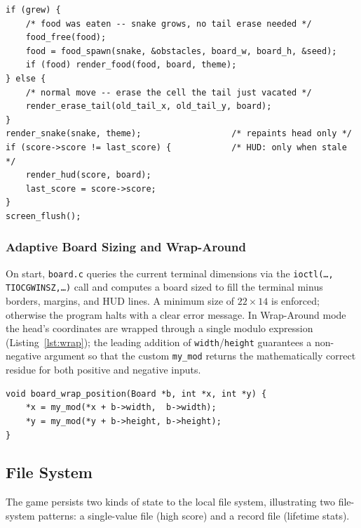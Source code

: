 \documentclass[conference]{IEEEtran}
\begin{document}
\begin{lstlisting}[caption={Delta-render hot path: O(1) per tick, regardless of snake length.},label={lst:delta}]
if (grew) {
    /* food was eaten -- snake grows, no tail erase needed */
    food_free(food);
    food = food_spawn(snake, &obstacles, board_w, board_h, &seed);
    if (food) render_food(food, board, theme);
} else {
    /* normal move -- erase the cell the tail just vacated */
    render_erase_tail(old_tail_x, old_tail_y, board);
}
render_snake(snake, theme);                  /* repaints head only */
if (score->score != last_score) {            /* HUD: only when stale */
    render_hud(score, board);
    last_score = score->score;
}
screen_flush();
\end{lstlisting}

\subsubsection{Adaptive Board Sizing and Wrap-Around}
On start, \texttt{board.c} queries the current terminal dimensions via the \texttt{ioctl(\dots,\,TIOCGWINSZ,\dots)} call and computes a board sized to fill the terminal minus borders, margins, and HUD lines. A minimum size of $22 \times 14$ is enforced; otherwise the program halts with a clear error message. In Wrap-Around mode the head's coordinates are wrapped through a single modulo expression (Listing~\ref{lst:wrap}); the leading addition of \texttt{width}/\texttt{height} guarantees a non-negative argument so that the custom \texttt{my\_mod} returns the mathematically correct residue for both positive and negative inputs.

\begin{lstlisting}[caption={Branch-free toroidal wrap using the custom \texttt{my\_mod}.},label={lst:wrap}]
void board_wrap_position(Board *b, int *x, int *y) {
    *x = my_mod(*x + b->width,  b->width);
    *y = my_mod(*y + b->height, b->height);
}
\end{lstlisting}

\subsection{File System}
\label{sec:fs}

The game persists two kinds of state to the local file system, illustrating two file-system patterns: a single-value file (high score) and a record file (lifetime stats).
\end{document}
